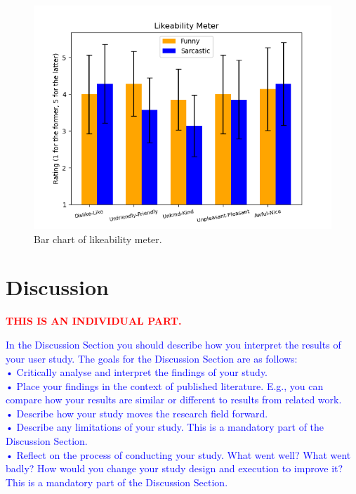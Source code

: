 \documentclass[conference]{IEEEtran}
\begin{document}
        \begin{figure}[htbp]
        \centering
        \includegraphics[width = \linewidth]{Pics/Likeability.png}
        \caption{Bar chart of likeability meter.}
        \label{fig:LikeabilityBar}
    \end{figure}


\section{Discussion}



\textcolor{red}{\textbf{THIS IS AN INDIVIDUAL PART.}}

\textcolor{blue}{
In the Discussion Section you should describe how you interpret the results of your user study. 
The goals for the Discussion Section are as follows:\\
• Critically analyse and interpret the findings of your study.\\
• Place your findings in the context of published literature. E.g., you can compare how 
your results are similar or different to results from related work.\\
• Describe how your study moves the research field forward.\\
• Describe any limitations of your study. This is a mandatory part of the Discussion 
Section.\\
• Reflect on the process of conducting your study. What went well? What went badly? 
How would you change your study design and execution to improve it? This is a 
mandatory part of the Discussion Section.
}
\end{document}
